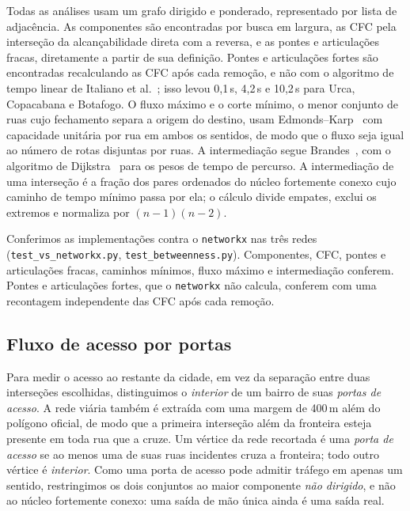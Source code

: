 Todas as análises usam um grafo dirigido e ponderado, representado por
lista de adjacência. As componentes são encontradas por busca em
largura, as CFC pela interseção da alcançabilidade direta com a reversa,
e as pontes e articulações fracas, diretamente a partir de sua
definição. Pontes e articulações fortes são encontradas recalculando as
CFC após cada remoção, e não com o algoritmo de tempo linear de Italiano
et al.~\cite{italiano2012finding}; isso levou 0,1\,s, 4,2\,s e 10,2\,s para Urca, Copacabana e
Botafogo. O fluxo máximo e o corte mínimo, o menor conjunto de ruas cujo
fechamento separa a origem do destino, usam
Edmonds--Karp~\cite{edmonds1972theoretical} com capacidade unitária por
rua em ambos os sentidos, de modo que o fluxo seja igual ao número de
rotas disjuntas por ruas. A intermediação segue Brandes~\cite{brandes2001faster}, com o algoritmo
de Dijkstra~\cite{dijkstra1959note} para os pesos de tempo de percurso.
A intermediação de uma interseção é a fração dos pares ordenados do
núcleo fortemente conexo cujo caminho de tempo mínimo passa por ela; o
cálculo divide empates, exclui os extremos e normaliza por $(n-1)(n-2)$.

Conferimos as implementações contra o \texttt{networkx} nas três redes
(\texttt{test\_vs\_networkx.py}, \texttt{test\_betweenness.py}).
Componentes, CFC, pontes e articulações fracas, caminhos mínimos, fluxo
máximo e intermediação conferem. Pontes e articulações fortes, que o
\texttt{networkx} não calcula, conferem com uma recontagem independente
das CFC após cada remoção.

\subsection{Fluxo de acesso por portas}
\label{sec:access-flow}

Para medir o acesso ao restante da cidade, em vez da separação entre
duas interseções escolhidas, distinguimos o \emph{interior} de um bairro
de suas \emph{portas de acesso}. A rede viária também é extraída com uma
margem de 400\,m além do polígono oficial, de modo que a primeira
interseção além da fronteira esteja presente em toda rua que a cruze.
Um vértice da rede recortada é uma \emph{porta de acesso} se ao menos
uma de suas ruas incidentes cruza a fronteira; todo outro vértice é
\emph{interior}. Como uma porta de acesso pode admitir tráfego em apenas
um sentido, restringimos os dois conjuntos ao maior componente
\emph{não dirigido}, e não ao núcleo fortemente conexo: uma saída de mão
única ainda é uma saída real.

